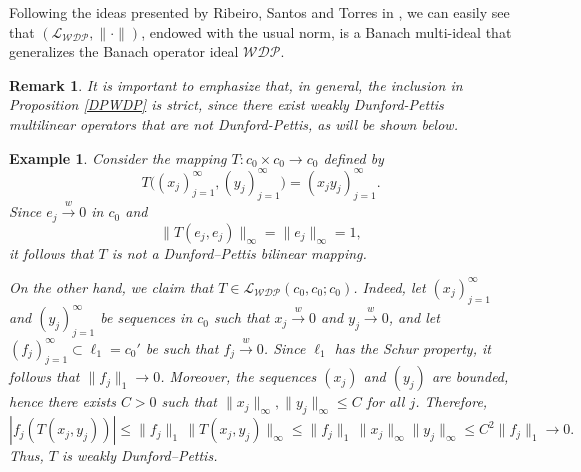 \documentclass[12 pt]{article}%
\newtheorem{example}[theorem]{Example}
\newtheorem{remark}[theorem]{Remark}
\newtheorem{final remark}[theorem]{Final Remark}
\begin{document}
Following the ideas presented by Ribeiro, Santos and Torres in \cite[Proposition 2.8]{RST22}, we can easily see that $(\mathcal{L_{WDP}}, \|\cdot\|)$, endowed with the usual norm, is a Banach multi-ideal that generalizes the Banach operator ideal $\mathcal{WDP}$.

\begin{remark}
	It is important to emphasize that, in general, the inclusion in Proposition \ref{DPWDP} is strict, since there exist weakly Dunford-Pettis multilinear operators that are not Dunford-Pettis, as will be shown below.
\end{remark}
%	

\begin{example}
	Consider the mapping $T\colon c_0 \times c_0 \to c_0$ defined by
	\[
	T\big((x_j)_{j=1}^{\infty}, (y_j)_{j=1}^{\infty}\big) = (x_j y_j)_{j=1}^{\infty}.
	\]
	Since $e_j \overset{w}{\to} 0$ in $c_0$ and
	\[
	\|T(e_j,e_j)\|_{\infty} = \|e_j\|_{\infty} = 1,
	\]
	it follows that $T$ is not a Dunford--Pettis bilinear mapping.
	
	On the other hand, we claim that $T \in \mathcal{L_{WDP}}(c_0,c_0;c_0)$. Indeed, let $(x_j)_{j=1}^{\infty}$ and $(y_j)_{j=1}^{\infty}$ be sequences in $c_0$ such that $x_j \overset{w}{\to} 0$ and $y_j \overset{w}{\to} 0$, and let $(f_j)_{j=1}^{\infty} \subset \ell_1 = c_0'$ be such that $f_j \overset{w}{\to} 0$. Since $\ell_1$ has the Schur property, it follows that $\|f_j\|_1 \to 0$. Moreover, the sequences $(x_j)$ and $(y_j)$ are bounded, hence there exists $C>0$ such that $\|x_j\|_{\infty}, \|y_j\|_{\infty} \le C$ for all $j$. Therefore,
	\[
	|f_j(T(x_j,y_j))|
	\le \|f_j\|_1 \, \|T(x_j,y_j)\|_{\infty}
	\le \|f_j\|_1 \, \|x_j\|_{\infty} \|y_j\|_{\infty}
	\le C^2 \|f_j\|_1 \longrightarrow 0.
	\]
	Thus, $T$ is weakly Dunford--Pettis.
\end{example}
\end{document}
